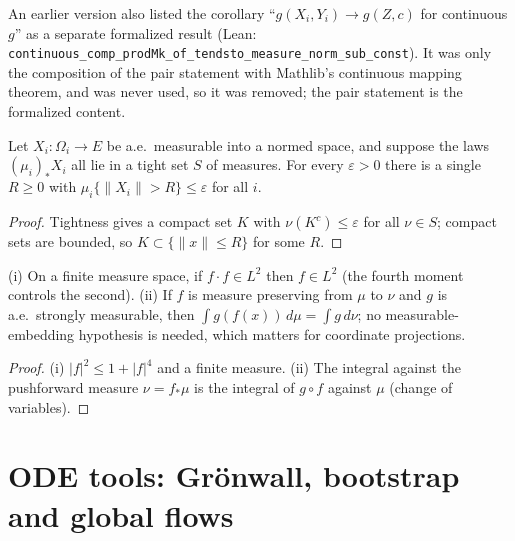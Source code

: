 \begin{remark}\label{rmk:ntkf:slutskyChange}
An earlier version also listed the corollary ``$g(X_i,Y_i)\to g(Z,c)$ for continuous $g$'' as a separate formalized result (Lean: \texttt{continuous\_comp\_prodMk\_of\_tendsto\_measure\_norm\_sub\_const}). It was only the composition of the pair statement with Mathlib's continuous mapping theorem, and was never used, so it was removed; the pair statement is the formalized content.
\end{remark}


\begin{lemma}\label{lem:ntkf:tightRadius}
  \leanok
Let $X_i:\Omega_i\to E$ be a.e.\ measurable into a normed space, and suppose the laws
$(\mu_i)_*X_i$ all lie in a tight set $S$ of measures. For every $\varepsilon>0$ there is a single
$R\ge0$ with $\mu_i\{\|X_i\|>R\}\le\varepsilon$ for all $i$.
\end{lemma}

\begin{proof}
  \leanok
Tightness gives a compact set $K$ with $\nu(K^c)\le\varepsilon$ for all $\nu\in S$; compact sets
are bounded, so $K\subset\{\|x\|\le R\}$ for some $R$.
\end{proof}

\begin{lemma}\label{lem:ntkf:integrationFacts}
  \leanok
(i) On a finite measure space, if $f\cdot f\in L^2$ then $f\in L^2$ (the fourth moment controls
the second). (ii) If $f$ is measure preserving from $\mu$ to $\nu$ and $g$ is a.e.\ strongly
measurable, then $\int g(f(x))\,d\mu=\int g\,d\nu$; no measurable-embedding hypothesis is needed,
which matters for coordinate projections.
\end{lemma}

\begin{proof}
  \leanok
(i) $|f|^2\le1+|f|^4$ and a finite measure. (ii) The integral against the pushforward measure
$\nu=f_*\mu$ is the integral of $g\circ f$ against $\mu$ (change of variables).
\end{proof}


\section{ODE tools: Gr\"onwall, bootstrap and global flows}\label{sec:ntkf:ode}

